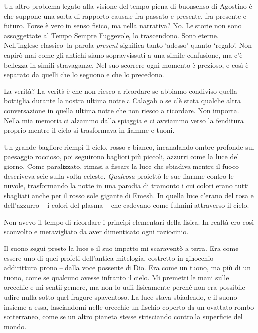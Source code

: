 \begin{figure}
	\centering
	\def\svgwidth{\columnwidth}
	\scalebox{0.2}{}
\end{figure}

Un altro problema legato alla visione del tempo piena di buonsenso di
Agostino è che suppone una sorta di rapporto causale fra passato e
presente, fra presente e futuro. Forse è vero in senso fisico, ma nella
narrativa? No. Le storie non sono assoggettate al Tempo Sempre
Fuggevole, lo trascendono. Sono eterne. Nell'inglese classico, la parola
\emph{present} significa tanto `adesso' quanto `regalo'. Non capirò mai
come gli antichi siano sopravvissuti a una simile confusione, ma c'è
bellezza in simili stravaganze. Nel suo scorrere ogni momento è
prezioso, e così è separato da quelli che lo seguono e che lo precedono.

La verità? La verità è che non riesco a ricordare se abbiamo condiviso
quella bottiglia durante la nostra ultima notte a Calagah o se c'è stata
qualche altra conversazione in quella ultima notte che non riesco a
ricordare. Non importa. Nella mia memoria ci alzammo dalla spiaggia e ci
avviammo verso la fenditura proprio mentre il cielo si trasformava in
fiamme e tuoni.

Un grande bagliore riempì il cielo, rosso e bianco, incanalando ombre
profonde sul paesaggio roccioso, poi seguirono bagliori più piccoli,
azzurri come la luce del giorno. Come paralizzato, rimasi a fissare la
luce che sbiadiva mentre il fuoco descriveva scie sulla volta celeste.
\emph{Qualcosa} proiettò le sue fiamme contro le nuvole, trasformando la
notte in una parodia di tramonto i cui colori erano tutti sbagliati
anche per il rosso sole gigante di Emesh. In quella luce c'erano del
rosa e dell'azzurro -- i colori del plasma -- che cadevano come fulmini
attraverso il cielo.

Non avevo il tempo di ricordare i princìpi elementari della fisica. In
realtà ero così sconvolto e meravigliato da aver dimenticato ogni
raziocinio.

Il suono seguì presto la luce e il suo impatto mi scaraventò a terra.
Era come essere uno di quei profeti dell'antica mitologia, costretto in
ginocchio -- addirittura prono -- dalla voce possente di Dio. Era come
un tuono, ma più di un tuono, come se qualcuno {avesse} infranto il
cielo. Mi premetti le mani sulle orecchie e mi sentii gemere, ma non lo
udii fisicamente perché non era possibile udire nulla sotto quel fragore
spaventoso. La luce stava sbiadendo, e il suono insieme a essa,
lasciandomi nelle orecchie un fischio coperto da un ovattato rombo
sotterraneo, come se un altro pianeta stesse strisciando contro la
superficie del mondo.

